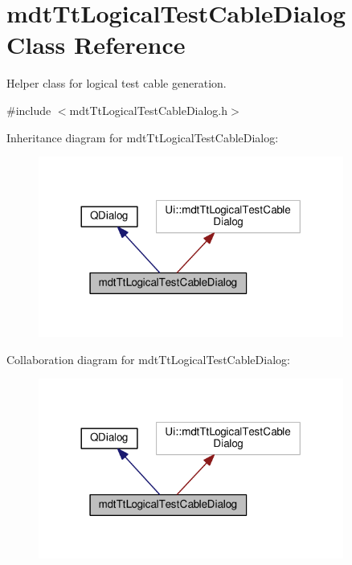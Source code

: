 \hypertarget{classmdt_tt_logical_test_cable_dialog}{\section{mdt\-Tt\-Logical\-Test\-Cable\-Dialog Class Reference}
\label{classmdt_tt_logical_test_cable_dialog}
}


Helper class for logical test cable generation.  




{\ttfamily \#include $<$mdt\-Tt\-Logical\-Test\-Cable\-Dialog.\-h$>$}



Inheritance diagram for mdt\-Tt\-Logical\-Test\-Cable\-Dialog\-:
\nopagebreak
\begin{figure}[H]
\begin{center}
\leavevmode
\includegraphics[width=284pt]{classmdt_tt_logical_test_cable_dialog__inherit__graph}
\end{center}
\end{figure}


Collaboration diagram for mdt\-Tt\-Logical\-Test\-Cable\-Dialog\-:
\nopagebreak
\begin{figure}[H]
\begin{center}
\leavevmode
\includegraphics[width=284pt]{classmdt_tt_logical_test_cable_dialog__coll__graph}
\end{center}
\end{figure}
